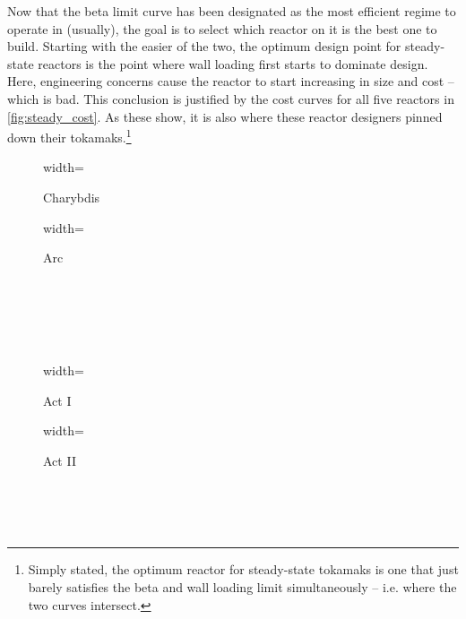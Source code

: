 Now that the beta limit curve has been designated as the most efficient regime to operate in (usually), the goal is to select which reactor on it is the best one to build. Starting with the easier of the two, the optimum design point for steady-state reactors is the point where wall loading first starts to dominate design. Here, engineering concerns cause the reactor to start increasing in size and cost -- which is bad. This conclusion is justified by the cost curves for all five reactors in \cref{fig:steady_cost}. As these show, it is also where these reactor designers pinned down their tokamaks.\footnote{ Simply stated, the optimum reactor for steady-state tokamaks is one that just barely satisfies the beta and wall loading limit simultaneously -- i.e. where the two curves intersect. }

\begin{figure*}
    \centering
    \hfill 
    \begin{subfigure}[t]{0.45\textwidth}
        \centering
		\begin{adjustbox}{width=\textwidth}
			\Large
			
		\end{adjustbox}
        \caption{Charybdis}
    \end{subfigure}
    \hfill
    \begin{subfigure}[t]{0.45\textwidth}
        \centering
		\begin{adjustbox}{width=\textwidth}
			\Large
			
		\end{adjustbox}
        \caption{Arc}
    \end{subfigure}
    \hfill \hfill ~\\ ~\\ ~\\ ~\\
    \hfill 
    \begin{subfigure}[t]{0.45\textwidth}
        \centering
		\begin{adjustbox}{width=\textwidth}
			\Large
			
		\end{adjustbox}
        \caption{Act I}
    \end{subfigure}
    \hfill
    \begin{subfigure}[t]{0.45\textwidth}
        \centering
		\begin{adjustbox}{width=\textwidth}
			\Large
			
		\end{adjustbox}
        \caption{Act II}
    \end{subfigure}
    \hfill \hfill ~\\ ~\\ ~\\
    \caption{Steady State Cost Curves}
    \label{fig:steady_cost}
\end{figure*}


